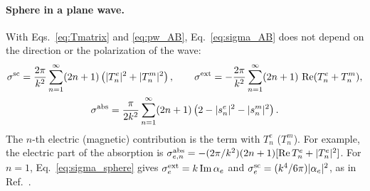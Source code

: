 \documentclass[
    pra,
    aps,
    reprint,
    onecolumn,
    amsmath,amssymb,
    a4paper,
    superscriptaddress,
    10pt,
    nofootinbib
]{revtex4-2}
\begin{document}
\paragraph{Sphere in a plane wave.}
With Eqs.~\eqref{eq:Tmatrix} and \eqref{eq:pw_AB}, Eq.~\eqref{eq:sigma_AB} does not depend on the direction or the polarization of the wave:
\begin{gather}
    \sigma^{\rm sc} = \frac{2\pi}{k^2}\sum_{n=1}^\infty(2n+1)\left(|T^e_n|^2 + |T^m_n|^2\right), \qquad
    \sigma^{\rm ext} = -\frac{2\pi}{k^2}\sum_{n=1}^\infty(2n+1)\, \Re(T^e_n + T^m_n),
    \label{eq:sigma_sphere}
    \\
    \sigma^{\rm abs} = \frac{\pi}{2k^2}\sum_{n=1}^\infty(2n+1)\left(2 - |s^e_n|^2 - |s^m_n|^2\right).
    \label{eq:sigma_abs_s}
\end{gather}
The $n$-th electric (magnetic) contribution is the term with $T^e_n$ ($T^m_n$).
For example, the electric part of the absorption is $\sigma^{\rm abs}_{e,n} = -(2\pi/k^2)(2n+1)[\Re T^e_n + |T^e_n|^2]$.
For $n = 1$, Eq.~\eqref{eq:sigma_sphere} gives $\sigma^{\rm ext}_e = k\Im\alpha_e$ and $\sigma^{\rm sc}_e = (k^4/6\pi)|\alpha_e|^2$, as in Ref.~\cite{Thesis}.
\end{document}
